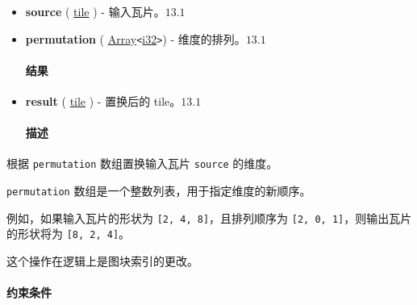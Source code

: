 \documentclass{article}
\begin{document}
\begin{itemize}
\item \textbf{source} ( \href{https://docs.nvidia.com/cuda/tile-ir/latest/sections/types.html#type-tile}{tile} ) - 输入瓦片。$\boxed{13.1}$
\item \textbf{permutation} ( \href{https://docs.nvidia.com/cuda/tile-ir/latest/sections/operations.html#type-array}{Array}\texttt{<}\href{https://docs.nvidia.com/cuda/tile-ir/latest/sections/types.html#subsection-element-types}{i32}\texttt{>}) - 维度的排列。$\boxed{13.1}$


\paragraph{结果}

\item \textbf{result} ( \href{https://docs.nvidia.com/cuda/tile-ir/latest/sections/types.html#type-tile}{tile} ) - 置换后的 tile。$\boxed{13.1}$


\paragraph{描述}

\end{itemize}
根据 \texttt{permutation} 数组置换输入瓦片 \texttt{source} 的维度。

\texttt{permutation} 数组是一个整数列表，用于指定维度的新顺序。


例如，如果输入瓦片的形状为 \texttt{[2, 4, 8]}，且排列顺序为 \texttt{[2, 0, 1]}，则输出瓦片的形状将为 \texttt{[8, 2, 4]}。


这个操作在逻辑上是图块索引的更改。



\paragraph{约束条件}
\end{document}
